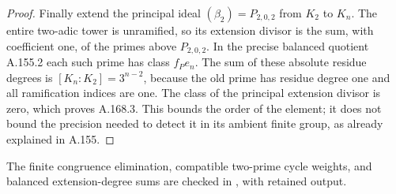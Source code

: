 \begin{proof}
Finally extend the principal ideal \((\beta_2)=P_{2,0,2}\)
from \(K_2\) to \(K_n\).  The entire two-adic tower is unramified,
so its extension divisor is the sum, with coefficient one, of
the primes above \(P_{2,0,2}\).  In the precise balanced quotient
A.155.2 each such prime has class \(f_P e_n\).  The sum of
these absolute residue degrees is \([K_n:K_2]=3^{n-2}\), because
the old prime has residue degree one and all ramification indices
are one.  The class of the principal extension divisor is zero,
which proves A.168.3.  This bounds the order of the element;
it does not bound the precision needed to detect it in its ambient
finite group, as already explained in A.155.
\end{proof}

The finite congruence elimination, compatible two-prime cycle weights,
and balanced extension-degree sums are checked in
, with retained output.
